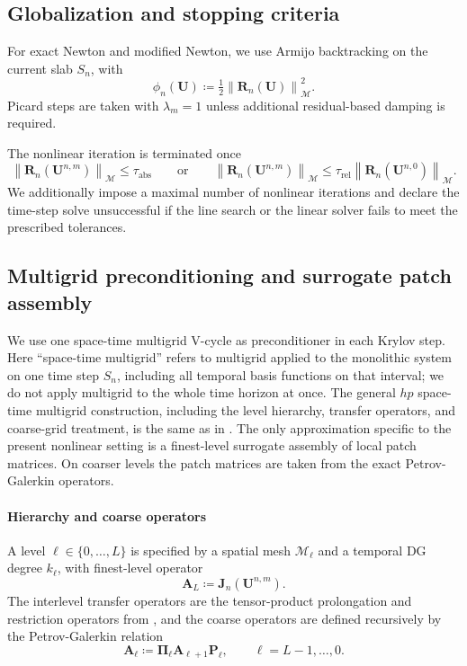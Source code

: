 \documentclass[DIV=16]{scrartcl}
\newcommand{\norm}[1]{\left\lVert #1\right\rVert}
\newcommand{\Sn}{S_n}
\begin{document}
\subsection{Globalization and stopping criteria}

For exact Newton and modified Newton, we use Armijo backtracking on the
current slab $\Sn$, with
\[
  \phi_n(\bm U)\coloneq \tfrac12 \norm{\bm R_n(\bm U)}_{\mathcal M}^2.
\]
Picard steps are taken with $\lambda_m=1$ unless additional residual-based
damping is required.

The nonlinear iteration is terminated once
\begin{equation}\label{eq:nk-stop}
  \norm{\bm R_n(\bm U^{n,m})}_{\mathcal M}\le \tau_{\mathrm{abs}}
  \qquad\text{or}\qquad
  \norm{\bm R_n(\bm U^{n,m})}_{\mathcal M}
  \le
  \tau_{\mathrm{rel}}\norm{\bm R_n(\bm U^{n,0})}_{\mathcal M}.
\end{equation}
We additionally impose a maximal number of nonlinear iterations and declare the
time-step solve unsuccessful if the line search or the linear solver fails to meet
the prescribed tolerances.

\subsection{Multigrid preconditioning and surrogate patch assembly}
\label{sec:mg-framework}

We use one space-time multigrid V-cycle as preconditioner in each Krylov step.
Here ``space-time multigrid'' refers to multigrid applied to the monolithic
system on one time step $\Sn$, including all temporal basis functions on that
interval; we do not apply multigrid to the whole time horizon at once.
The general $hp$ space-time multigrid construction, including the level
hierarchy, transfer operators, and coarse-grid treatment, is the same as in
\cite{MargenbergBause2026MonolithicSTMG,MargenbergMunchBause2025hpMGStokes}.
The only approximation specific to the present nonlinear setting is a
finest-level surrogate assembly of local patch matrices. On coarser levels the
patch matrices are taken from the exact Petrov-Galerkin operators.

\paragraph{Hierarchy and coarse operators}
A level $\ell\in\{0,\dots,L\}$ is specified by a spatial mesh $\mathcal M_\ell$
and a temporal DG degree $k_\ell$, with finest-level operator
\[
  \bm A_L \coloneq \bm J_n(\bm U^{n,m}).
\]
The interlevel transfer operators are the tensor-product prolongation and
restriction operators from
\cite{MargenbergBause2026MonolithicSTMG,MargenbergMunchBause2025hpMGStokes},
and the coarse operators are defined recursively by the Petrov-Galerkin
relation
\[
  \bm A_\ell \coloneq \bm \Pi_\ell \bm A_{\ell+1}\bm P_\ell,
  \qquad \ell=L-1,\dots,0.
\]
\end{document}
